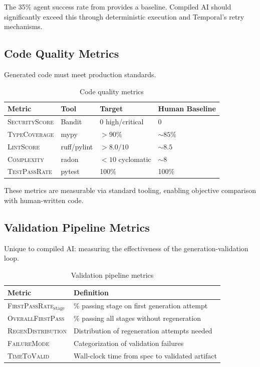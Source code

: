 \documentclass[11pt]{article}
\newcommand{\metric}[1]{\textsc{#1}}
\begin{document}
The 35\% agent success rate from \citet{salesforce2025agents} provides a baseline. Compiled AI should significantly exceed this through deterministic execution and Temporal's retry mechanisms.

\subsection{Code Quality Metrics}

Generated code must meet production standards.

\begin{table}[ht]
\centering
\caption{Code quality metrics}
\label{tab:quality-metrics}
\begin{tabular}{p{3.5cm}p{3cm}p{3cm}p{2.5cm}}
\toprule
Metric & Tool & Target & Human Baseline \\
\midrule
\metric{SecurityScore} & Bandit & 0 high/critical & 0 \\
\metric{TypeCoverage} & mypy & $> 90\%$ & $\sim 85\%$ \\
\metric{LintScore} & ruff/pylint & $> 8.0/10$ & $\sim 8.5$ \\
\metric{Complexity} & radon & $< 10$ cyclomatic & $\sim 8$ \\
\metric{TestPassRate} & pytest & 100\% & 100\% \\
\bottomrule
\end{tabular}
\end{table}

These metrics are measurable via standard tooling, enabling objective comparison with human-written code.

\subsection{Validation Pipeline Metrics}

Unique to compiled AI: measuring the effectiveness of the generation-validation loop.

\begin{table}[ht]
\centering
\caption{Validation pipeline metrics}
\label{tab:validation-metrics}
\begin{tabular}{p{4cm}p{8cm}}
\toprule
Metric & Definition \\
\midrule
\metric{FirstPassRate}$_{\text{stage}}$ & \% passing stage on first generation attempt \\
\metric{OverallFirstPass} & \% passing all stages without regeneration \\
\metric{RegenDistribution} & Distribution of regeneration attempts needed \\
\metric{FailureMode} & Categorization of validation failures \\
\metric{TimeToValid} & Wall-clock time from spec to validated artifact \\
\bottomrule
\end{tabular}
\end{table}
\end{document}

